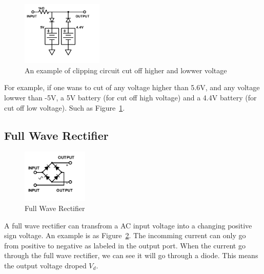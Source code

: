 \documentclass[aps,prl,reprint]{revtex4-1}
\begin{document}
    \begin{figure}[h]
        \centering
        \includegraphics[height=1.2in]{image/Clipping-Circuit-Dual-Lab.pdf}
        \caption{An example of clipping circuit cut off higher and lowwer voltage}
        \label{fig:clippingCircuitDualLab}
    \end{figure}
    For example, if one wans to cut of any voltage higher than 5.6V, and any voltage lowwer than -5V, a 5V battery (for cut off high voltage) and a 4.4V battery (for cut off low voltage). Such as Figure~\ref{fig:clippingCircuitDualLab}.

    \subsection{Full Wave Rectifier}
    \begin{figure}[h]
        \centering
        \includegraphics[height=1in]{image/Full-Wave-Rectifier.pdf}
        \caption{Full Wave Rectifier}
        \label{fig:fullWaveRectifier}
    \end{figure}

    A full wave rectifier can transfrom a AC input voltage into a changing positive sign voltage. An example is as Figure~\ref{fig:fullWaveRectifier}. The incomming current can only go from positive to negative as labeled in the output port. When the current go through the full wave rectifier, we can see it will go through a diode. This means the output voltage droped $V_d$.
\end{document}
